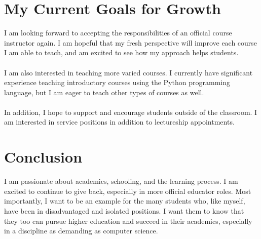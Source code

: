 \documentclass[12pt]{amsart} \usepackage{amssymb}
\begin{document}
\section*{My Current Goals for Growth}
\noindent I am looking forward to accepting the responsibilities of an official course instructor again. I am hopeful that my fresh perspective will improve each course I am able to teach, and am excited to see how my approach helps students.
\\\\\noindent I am also interested in teaching more varied courses. I currently have significant experience teaching introductory courses using the Python programming language, but I am eager to teach other types of courses as well.
\\\\\noindent In addition, I hope to support and encourage students outside of the classroom. I am interested in service positions in addition to lectureship appointments.

\section*{Conclusion}
\noindent I am passionate about academics, schooling, and the learning process. I am excited to continue to give back, especially in more official educator roles. Most importantly, I want to be an example for the many students who, like myself, have been in disadvantaged and isolated positions. I want them to know that they too can pursue higher education and succeed in their academics, especially in a discipline as demanding as computer science.
\end{document}
